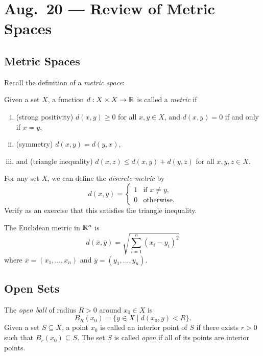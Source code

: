 \chapter{Aug.~20 --- Review of Metric Spaces}

\section{Metric Spaces}
Recall the definition of a \emph{metric space}:

\begin{definition}
  Given a set $X$, a function $d : X \times X \to \mathbb{R}$
  is called a \emph{metric} if
  \begin{enumerate}[(i)]
    \item (strong positivity)
      $d(x, y) \ge 0$ for all
      $x, y \in X$, and $d(x, y) = 0$ if and only if
      $x = y$,
    \item (symmetry) $d(x, y) = d(y, x)$,
    \item and (triangle inequality)
      $d(x, z) \le d(x, y) + d(y, z)$
      for all $x, y, z \in X$.
  \end{enumerate}
\end{definition}

\begin{example}
  For any set $X$, we can define the
  \emph{discrete metric}
  by
  \[
    d(x, y) =
    \begin{cases}
      1 & \text{if $x \ne y$}, \\
      0 & \text{otherwise}.
    \end{cases}
  \]
  Verify as an exercise that this satisfies
  the triangle inequality.
\end{example}

\begin{example}
  The Euclidean metric in $\mathbb{R}^n$ is
  \[
    d(\overline{x}, \overline{y})
    = \sqrt{\sum_{i = 1}^n (x_i - y_i)^2}
  \]
  where $\overline{x} = (x_1, \ldots, x_n)$
  and $\overline{y} = (y_1, \ldots, y_n)$.
\end{example}

\section{Open Sets}
\begin{definition}
  The \emph{open ball} of radius $R > 0$ around
  $x_0 \in X$ is
  \[
    B_R(x_0) = \{y \in X \mid d(x_0, y) < R\}
  .\]
  Given a set $S \subseteq X$, a point $x_0$
  is called an interior point of $S$ if there exists
  $r > 0$ such that $B_r(x_0) \subseteq S$.
  The set $S$ is called \emph{open} if all of its
  points are interior points.
\end{definition}

